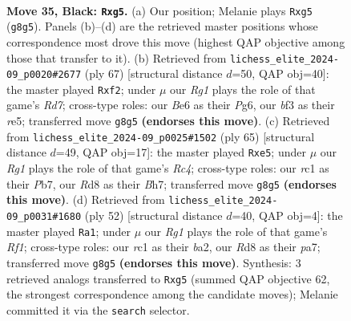 \documentclass[11pt]{article}
\begin{document}
\clearpage

\begin{figure}[p]\centering
\begin{subfigure}{0.46\textwidth}\centering
\resizebox{\linewidth}{!}{%
\newchessgame
\chessboard[
  setfen={3r1kr1/1p3p1p/4b3/p2p2P1/8/3K1BP1/PP3N1P/2R3R1 b - - 0 35},
  showmover=false,
  pgfstyle=straightmove, color=movearrow, markmove={g8-g5}
]}
\caption{}
\end{subfigure}\hfill
\begin{subfigure}{0.46\textwidth}\centering
\resizebox{\linewidth}{!}{%
\newchessgame
\chessboard[
  setfen={1k1r4/pp6/6pp/4R1p1/2P3P1/1P6/P2r1P2/1K2R3 b - - 1 34},
  showmover=false,
  pgfstyle=straightmove, color=movearrow, markmove={d2-f2}
]}
\caption{}
\end{subfigure}
\\[4pt]
\begin{subfigure}{0.46\textwidth}\centering
\resizebox{\linewidth}{!}{%
\newchessgame
\chessboard[
  setfen={6k1/1p3p1b/2p1p3/2r1P1p1/R7/6PP/Pr6/R5KB b - - 0 33},
  showmover=false,
  pgfstyle=straightmove, color=movearrow, markmove={c5-e5}
]}
\caption{}
\end{subfigure}\hfill
\begin{subfigure}{0.46\textwidth}\centering
\resizebox{\linewidth}{!}{%
\newchessgame
\chessboard[
  setfen={1r3r2/pBR1p2p/5kp1/8/5pP1/7P/bP3P2/5RK1 w - - 0 27},
  showmover=false,
  pgfstyle=straightmove, color=movearrow, markmove={f1-a1}
]}
\caption{}
\end{subfigure}
\caption{\textbf{Move 35, Black: \texttt{Rxg5}.} (a) Our position; Melanie plays \texttt{Rxg5} (\texttt{g8g5}). Panels (b)--(d) are the retrieved master positions whose correspondence most drove this move (highest QAP objective among those that transfer to it). (b) Retrieved from \texttt{lichess\_elite\_2024-09\_p0020\#2677} (ply 67) [structural distance $d$=50, QAP obj=40]: the master played \texttt{Rxf2}; under $\mu$ our \emph{Rg1} plays the role of that game's \emph{Rd7}; cross-type roles: our \emph{B}e6 as their \emph{P}g6, our \emph{b}f3 as their \emph{r}e5; transferred move \texttt{g8g5} \textbf{(endorses this move)}. (c) Retrieved from \texttt{lichess\_elite\_2024-09\_p0025\#1502} (ply 65) [structural distance $d$=49, QAP obj=17]: the master played \texttt{Rxe5}; under $\mu$ our \emph{Rg1} plays the role of that game's \emph{Rc4}; cross-type roles: our \emph{r}c1 as their \emph{P}b7, our \emph{R}d8 as their \emph{B}h7; transferred move \texttt{g8g5} \textbf{(endorses this move)}. (d) Retrieved from \texttt{lichess\_elite\_2024-09\_p0031\#1680} (ply 52) [structural distance $d$=40, QAP obj=4]: the master played \texttt{Ra1}; under $\mu$ our \emph{Rg1} plays the role of that game's \emph{Rf1}; cross-type roles: our \emph{r}c1 as their \emph{b}a2, our \emph{R}d8 as their \emph{p}a7; transferred move \texttt{g8g5} \textbf{(endorses this move)}. Synthesis: 3 retrieved analogs transferred to \texttt{Rxg5} (summed QAP objective 62, the strongest correspondence among the candidate moves); Melanie committed it via the \texttt{search} selector.}
\label{fig:thought-m69}
\end{figure}
\end{document}
